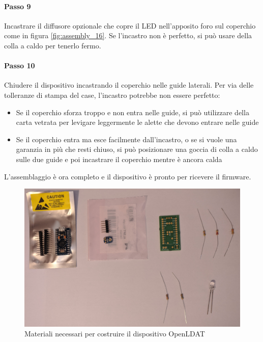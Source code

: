 \paragraph{Passo 9} Incastrare il diffusore opzionale che copre il LED nell'apposito foro sul coperchio come in figura \ref{fig:assembly_16}. Se l'incastro non è perfetto, si può usare della colla a caldo per tenerlo fermo.

\paragraph{Passo 10} Chiudere il dispositivo incastrando il coperchio nelle guide laterali. Per via delle tolleranze di stampa del case, l'incastro potrebbe non essere perfetto:\begin{itemize}
	\item Se il coperchio sforza troppo e non entra nelle guide, si può utilizzare della carta vetrata per levigare leggermente le alette che devono entrare nelle guide
	\item Se il coperchio entra ma esce facilmente dall'incastro, o se si vuole una garanzia in più che resti chiuso, si può posizionare una goccia di colla a caldo sulle due guide e poi incastrare il coperchio mentre è ancora calda
\end{itemize}

L'assemblaggio è ora completo e il dispositivo è pronto per ricevere il firmware.

\begin{figure}[H]
	\centering
	\includegraphics[width=\textwidth]{Dispositivo_files/assembly_01.jpg}
	\caption{Materiali necessari per costruire il dispositivo OpenLDAT}
	\label{fig:assembly_01}
\end{figure}

